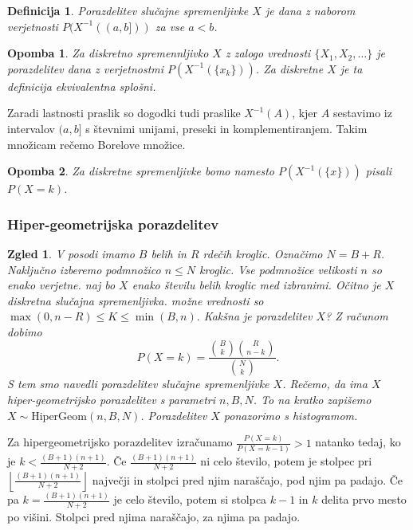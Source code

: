 \documentclass[10pt, a4paper]{article}
\newtheorem{defi}[izr]{Definicija}
\newenvironment{noticeB}{%
  \tcolorbox[%
  notitle,
  empty,
  enhanced,  %
  breakable,
  coltext=black,
  colback=white, 
  fontupper=\rmfamily,
  parbox=false,
  noparskip,
  sharp corners,
  boxrule=-1pt,  %
  frame hidden,
  left=7pt,  %
  right=7pt,
  top=5pt,
  bottom=5pt,
  before skip=2.5ex plus 2pt,
  after skip=2.5ex plus 2pt,
  borderline west = {1.5pt}{-0.1pt}{blue!30!black}, %
  overlay unbroken and last={%
    \draw[color=black, line width=1.25pt]
    ($(frame.south west)+(1.pt, -0.1pt)$) -- ++(2em, 0);
  }
  ]}
{\endtcolorbox}
\newenvironment{definicija}{\begin{defi}\begin{noticeB}}{%
    \end{noticeB}\end{defi}}
\newtheorem*{opomba}{Opomba}
\newtheorem{zgled}[izr]{Zgled}
\begin{document}
\begin{definicija}
  Porazdelitev slučajne spremenljivke $X$ je dana z naborom 
  verjetnosti $P(X^{-1} ((a, b]))$ za vse $a < b$.
\end{definicija}

\begin{opomba}
  Za diskretno spremennljivko $X$ z zalogo vrednosti $\{X_1, X_2, \dots\}$ je porazdelitev dana 
  z verjetnostmi $P(X^{-1} (\{x_k\}))$.
  Za diskretne $X$ je ta definicija ekvivalentna splošni.
\end{opomba}

Zaradi lastnosti praslik so dogodki tudi praslike $X^{-1} (A)$, kjer $A$ 
sestavimo iz intervalov $(a, b]$ s števnimi unijami, preseki in komplementiranjem.
Takim množicam rečemo Borelove množice.

\begin{opomba}
  Za diskretne spremenljivke bomo namesto $P(X^{-1} (\{x\}))$ pisali $P(X = k)$.
\end{opomba}

\subsubsection*{Hiper-geometrijska porazdelitev}

\begin{zgled}
  V posodi imamo $B$ belih in $R$ rdečih kroglic.
  Označimo $N = B + R$. Naključno izberemo podmnožico $n \leq N$
  kroglic. Vse podmnožice velikosti $n$ so enako verjetne.
  naj bo $X$ enako številu belih kroglic med izbranimi.
  Očitno je $X$ diskretna slučajna spremenljivka.
  možne vrednosti so 
  $\max(0, n - R) \leq K \leq \min(B, n).$
  Kakšna je porazdelitev $X$? Z računom dobimo 
  $$P(X = k) = \frac{\binom{B}{k} \binom{R}{n - k}}{\binom{N}{k}}.$$
  S tem smo navedli porazdelitev slučajne spremenljivke $X$.
  Rečemo, da ima $X$ hiper-geometrijsko porazdelitev s parametri $n, B, N$.
  To na kratko zapišemo $X \sim \mathrm{HiperGeom} (n, B, N)$.
  Porazdelitev $X$ ponazorimo s histogramom.
\end{zgled}

Za hipergeometrijsko porazdelitev izračunamo $\frac{P(X = k)}{P(X = k - 1)} > 1$
natanko tedaj, ko je $k < \frac{(B + 1)(n + 1)}{N + 2}$.
Če $\frac{(B + 1)(n + 1)}{N + 2}$ ni celo število, potem je stolpec pri 
$\left\lfloor \frac{(B + 1)(n + 1)}{N + 2} \right\rfloor$ največji in stolpci pred njim naraščajo, pod njim pa padajo.
Če pa $k = \frac{(B + 1)(n + 1)}{N + 2}$ je celo število, potem si stolpca $k - 1$ in $k$
delita prvo mesto po višini. Stolpci pred njima naraščajo, za njima pa padajo.
\end{document}
